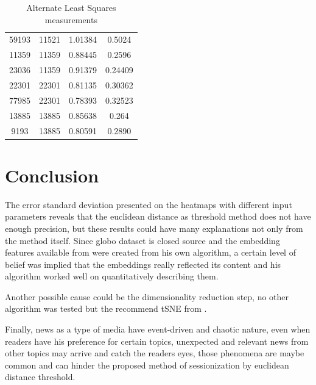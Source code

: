 \documentclass[ecp,tc,english]{iiufrgs}
\begin{document}
\begin{table}[H]
\begin{tabular}{ |c|c|c|c| }
                59193 & 11521 & 1.01384 & 0.5024 \\
                11359 & 11359 & 0.88445 & 0.2596 \\
                23036 & 11359 & 0.91379 & 0.24409 \\
                \rowcolor[RGB]{220,220,220}                
                22301 & 22301 & 0.81135 & 0.30362 \\
                \rowcolor[RGB]{220,220,220}                
                77985 & 22301 & 0.78393 & 0.32523 \\
                13885 & 13885 & 0.85638 & 0.264 \\
                9193 & 13885 & 0.80591 & 0.2890 \\
                \hline
            \end{tabular}
            \caption{Alternate Least Squares measurements}
            \label{tab:alternate_least_squares_metrics}
        \end{table}


\chapter{Conclusion}
The error standard deviation presented on the heatmaps with different input parameters reveals that the euclidean distance as threshold method does not have enough precision, but these results could have many explanations not only from the method itself. Since globo dataset is closed source and the embedding features available from \cite{moreira2018chameleon} were created from his own algorithm, a certain level of belief was implied that the embeddings really reflected its content and his algorithm worked well on quantitatively describing them.

Another possible cause could be the dimensionality reduction step, no other algorithm was tested but the recommend tSNE from \cite{moreira2018chameleon}.

Finally, news as a type of media have event-driven and chaotic nature, even when readers have his preference for certain topics, unexpected and relevant news from other topics may arrive and catch the readers eyes, those phenomena are maybe common and can hinder the proposed method of sessionization by euclidean distance threshold.



\end{document}
